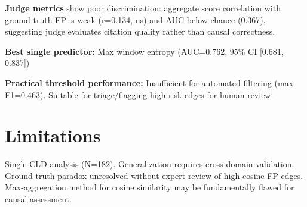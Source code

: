 \textbf{Judge metrics} show poor discrimination: aggregate score correlation with ground truth FP is weak (r=0.134, ns) and AUC below chance (0.367), suggesting judge evaluates citation quality rather than causal correctness.

\textbf{Best single predictor:} Max window entropy (AUC=0.762, 95\% CI [0.681, 0.837])

\textbf{Practical threshold performance:} Insufficient for automated filtering (max F1=0.463). Suitable for triage/flagging high-risk edges for human review.

\section{Limitations}

Single CLD analysis (N=182). Generalization requires cross-domain validation. Ground truth paradox unresolved without expert review of high-cosine FP edges. Max-aggregation method for cosine similarity may be fundamentally flawed for causal assessment.
